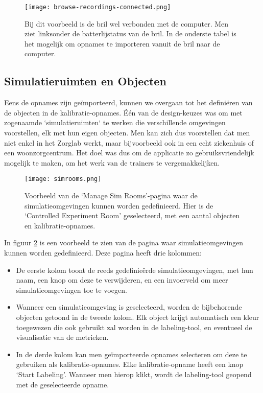 \begin{figure}[H]
  \centering
  \texttt{[image: browse-recordings-connected.png]}
  \caption[]{\label{fig:browse-recordings-connected} Bij dit voorbeeld is de bril wel verbonden met de computer. Men ziet linksonder de batterlijstatus van de bril. In de onderste tabel is het mogelijk om opnames te importeren vanuit de bril naar de computer. }
\end{figure}

\subsection{Simulatieruimten en Objecten}

Eens de opnames zijn geïmporteerd, kunnen we overgaan tot het definiëren van de objecten in de kalibratie-opnames. Één van de design-keuzes was om met zogenaamde `simulatieruimten` te werken die verschillende omgevingen voorstellen, elk met hun eigen objecten.
Men kan zich dus voorstellen dat men niet enkel in het Zorglab werkt, maar bijvoorbeeld ook in een echt ziekenhuis of een woonzorgcentrum. Het doel was dus om de applicatie zo gebruiksvriendelijk mogelijk te maken, om het werk van de trainers te vergemakkelijken.

\begin{figure}[H]
  \centering
  \texttt{[image: simrooms.png]}
  \caption[]{\label{fig:simrooms} Voorbeeld van de `Manage Sim Rooms'-pagina waar de simulatieomgevingen kunnen worden gedefinieerd. Hier is de `Controlled Experiment Room' geselecteerd, met een aantal objecten en kalibratie-opnames. }
\end{figure}

In figuur \ref{fig:simrooms} is een voorbeeld te zien van de pagina waar simulatieomgevingen kunnen worden gedefinieerd. 
Deze pagina heeft drie kolommen:
\begin{itemize}
    \item De eerste kolom toont de reeds gedefinieërde simulatieomgevingen, met hun naam, een knop om deze te verwijderen, en een invoerveld om meer simulatieomgevingen toe te voegen.
    \item Wanneer een simulatieomgeving is geselecteerd, worden de bijbehorende objecten getoond in de tweede kolom. Elk object krijgt automatisch een kleur toegewezen die ook gebruikt zal worden in de labeling-tool, en eventueel de visualisatie van de metrieken.
    \item In de derde kolom kan men geïmporteerde opnames selecteren om deze te gebruiken als kalibratie-opnames. Elke kalibratie-opname heeft een knop `Start Labeling'. Wanneer men hierop klikt, wordt de labeling-tool geopend met de geselecteerde opname.
\end{itemize}

